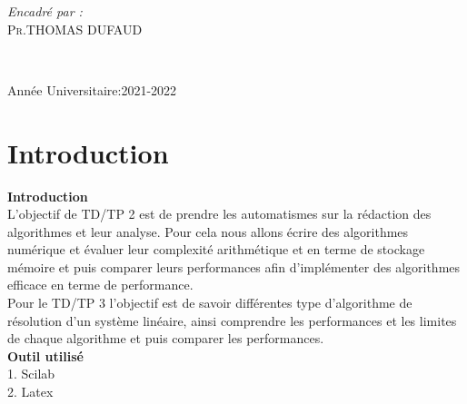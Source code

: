 \documentclass[12pt]{report}
\begin{document}
\begin{titlepage}
\begin{sffamily}
\begin{center}
\begin{minipage}{0.4\textwidth}
\begin{flushleft}
       
      \end{flushleft}
     \end{minipage}
     \begin{minipage}{0.4\textwidth}
      \begin{flushright} \large
       \textit{\Large Encadré par :}\\
       \textsc{\normalsize Pr.THOMAS DUFAUD}\\
       
      \end{flushright}
     \end{minipage}\\[1cm]
     
   
     
     \vfill
     

     {\large Année Universitaire:2021-2022}
     
    \end{center}
   \end{sffamily}
  \end{titlepage}
  

\pagebreak
\normalsize
\renewcommand{\footrulewidth}{1pt}


\chapter{Introduction}
\textbf{Introduction}\\


L'objectif de TD/TP 2 est de prendre les automatismes sur la rédaction des algorithmes et leur analyse. Pour cela nous allons écrire des algorithmes numérique et évaluer leur complexité arithmétique et en terme de stockage mémoire et puis comparer leurs performances afin d'implémenter des algorithmes efficace en terme de performance.\\

Pour le TD/TP 3 l'objectif est de savoir différentes type d'algorithme de résolution d'un système linéaire, ainsi comprendre les performances et les limites de chaque algorithme et puis comparer les performances.\\

\textbf{Outil utilisé}\\[0.5cm]
1. Scilab\\
2. Latex\\
\end{document}
